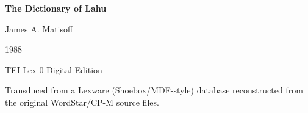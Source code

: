 
\begin{titlepage}
\centering
\vspace*{4cm}

{\Huge\bfseries The Dictionary of Lahu}\par
\vspace{1.2cm}
{\Large James A. Matisoff}\par
\vspace{0.2cm}
{\large 1988}\par

\vspace{2.5cm}
{\large TEI Lex-0 Digital Edition}\par

\vfill
{\small Transduced from a Lexware (Shoebox/MDF-style) database
  reconstructed from the original WordStar/CP-M source files.\par}

\vspace{1cm}

\end{titlepage}

\clearpage
